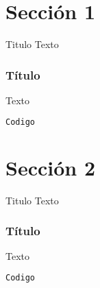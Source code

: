 
\section{Sección 1}

\begin{frame}[c]{Titulo}
  Texto
\end{frame}

\begin{frame}[fragile]
  \frametitle{Título}
  Texto
  \vspace{\baselineskip}
  \begin{lstlisting}[language=Python]
  Codigo
  \end{lstlisting}
\end{frame}

\section{Sección 2}

\begin{frame}[c]{Titulo}
  Texto
\end{frame}

\begin{frame}[fragile]
  \frametitle{Título}
  Texto
  \vspace{\baselineskip}
  \begin{lstlisting}[language=Python]
  Codigo
  \end{lstlisting}
\end{frame}

